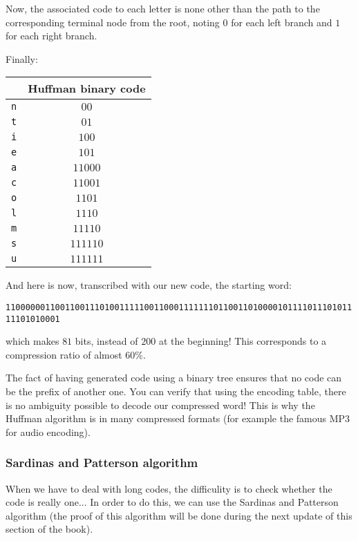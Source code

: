 	Now, the associated code to each letter is none other than the path to the corresponding terminal node from the root, noting $0$ for each left branch and $1$ for each right branch.

	Finally:
	\begin{table}[H]
		\centering
		\begin{tabular}{|c|c|}
		\hline
		\rowcolor[HTML]{9B9B9B} 
		\multicolumn{1}{|l|}{\cellcolor[HTML]{9B9B9B}\textbf{Letter}} & \multicolumn{1}{l|}{\cellcolor[HTML]{9B9B9B}\textbf{Huffman binary code}} \\ \hline
		\texttt{n} & $00$ \\ \hline
		\texttt{t} & $01$ \\ \hline
		\texttt{i} & $100$ \\ \hline
		\texttt{e} & $101$ \\ \hline
		\texttt{a} & $11000$ \\ \hline
		\texttt{c} & $11001$ \\ \hline
		\texttt{o} & $1101$ \\ \hline
		\texttt{l} & $1110$ \\ \hline
		\texttt{m} & $11110$ \\ \hline
		\texttt{s} & $111110$ \\ \hline
		\texttt{u} & $111111$ \\ \hline
		\end{tabular}
	\end{table}
	And here is now, transcribed with our new code, the starting word:
	\begin{center}
	{\small \texttt{110000001100110011101001111100110001111111011001101000010111101110101111101010001}}
	\end{center}
	which makes $81$ bits, instead of $200$ at the beginning! This corresponds to a compression ratio of almost $60\%$.
	
	The fact of having generated code using a binary tree ensures that no code can be the prefix of another one. You can verify that using the encoding table, there is no ambiguity possible to decode our compressed word! This is why the Huffman algorithm is in many compressed formats (for example the famous MP3 for audio encoding).
	
	\subsubsection{Sardinas and Patterson algorithm}
	When we have to deal with long codes, the difficulity is to check whether the code is really one... In order to do this, we can use the Sardinas and Patterson algorithm (the proof of this algorithm will be done during the next update of this section of the book).

